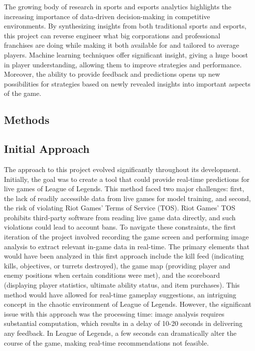 \documentclass[10pt,twocolumn]{article}
\begin{document}
The growing body of research in sports and esports analytics highlights the increasing importance of data-driven decision-making in competitive environments. By synthesizing insights from both traditional sports and esports, this project can reverse engineer what big corporations and professional franchises are doing while making it both available for and tailored to average players. Machine learning techniques offer significant insight, giving a huge boost in player understanding, allowing them to improve strategies and performance. Moreover, the ability to provide feedback and predictions opens up new possibilities for strategies based on newly revealed insights into important aspects of the game.



\subsection{Methods}

\subsection{Initial Approach}
The approach to this project evolved significantly throughout its development. Initially, the goal was to create a tool that could provide real-time predictions for live games of League of Legends. This method faced two major challenges: first, the lack of readily accessible data from live games for model training, and second, the risk of violating Riot Games' Terms of Service (TOS). Riot Games’ TOS prohibits third-party software from reading live game data directly, and such violations could lead to account bans. To navigate these constraints, the first iteration of the project involved recording the game screen and performing image analysis to extract relevant in-game data in real-time. The primary elements that would have been analyzed in this first approach include the kill feed (indicating kills, objectives, or turrets destroyed), the game map (providing player and enemy positions when certain conditions were met), and the scoreboard (displaying player statistics, ultimate ability status, and item purchases). This method would have allowed for real-time gameplay suggestions, an intriguing concept in the chaotic environment of League of Legends. However, the significant issue with this approach was the processing time: image analysis requires substantial computation, which results in a delay of 10-20 seconds in delivering any feedback. In League of Legends, a few seconds can dramatically alter the course of the game, making real-time recommendations not feasible. 
\end{document}
